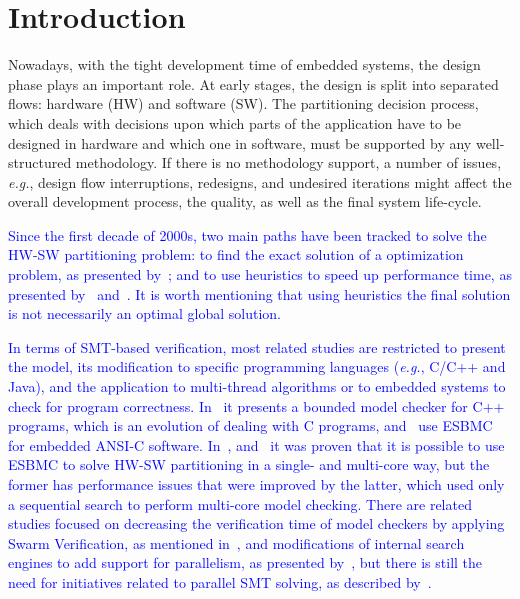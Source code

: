 \documentclass{doublecol-new}
\theoremstyle{TH}{
\newtheorem{lemma}{Lemma}
\newtheorem{theorem}[lemma]{Theorem}
\newtheorem{corrolary}[lemma]{Corrolary}
\newtheorem{conjecture}[lemma]{Conjecture}
\newtheorem{proposition}[lemma]{Proposition}
\newtheorem{claim}[lemma]{Claim}
\newtheorem{stheorem}[lemma]{Wrong Theorem}
\newtheorem{algorithm}{Algorithm}
}
\theoremstyle{THrm}{
\newtheorem{definition}{Definition}[section]
\newtheorem{question}{Question}[section]
\newtheorem{remark}{Remark}
\newtheorem{scheme}{Scheme}
}
\theoremstyle{THhit}{
\newtheorem{case}{Case}[section]
}
\begin{document}
\section{Introduction}

Nowadays, with the tight development time of embedded systems, the design phase plays an important role. At early stages, the design is split into separated flows: hardware (HW) and software (SW). The partitioning decision process, which deals with decisions upon which parts of the application have to be designed in hardware and which one in software, must be supported by any well-structured methodology. If there is no methodology support, a number of issues, {\it e.g.}, design flow interruptions, redesigns, and undesired iterations might affect the overall development process, the quality, as well as the final system life-cycle.

\textcolor{blue}{Since the first decade of 2000s, two main paths have been tracked to solve the HW-SW partitioning problem: to find the exact solution of a optimization problem, as presented by~\cite{Mann2007}; and to use heuristics to speed up performance time, as presented by~\cite{Arato2003} and~\cite{Arato2005}. It is worth mentioning that using heuristics the final solution is not necessarily an optimal global solution.} 

\textcolor{blue}{In terms of SMT-based verification, most related studies are restricted to present the model, its modification to specific programming languages ({\it e.g.}, C/C++ and Java), and the application to multi-thread algorithms or to embedded systems to check for program correctness. In~\cite{Ramalho2013} it presents a bounded model checker for C++ programs, which is an evolution of dealing with C programs, and~\cite{Cordeiro2012} use ESBMC for embedded ANSI-C software. In~\cite{Trindade2015}, and~\cite{Trindade2016} it was proven that it is possible to use ESBMC to solve HW-SW partitioning in a single- and multi-core way, but the former has performance issues that were improved by the latter, which used only a sequential search to perform multi-core model checking. There are related studies focused on decreasing the verification time of model checkers by applying Swarm Verification, as mentioned in~\cite{Holzmann2011}, and modifications of internal search engines to add support for parallelism, as presented by~\cite{Holzmann2012}, but there is still the need for initiatives related to parallel SMT solving, as described by~\cite{Wintersteiger2009}.} 
\end{document}
